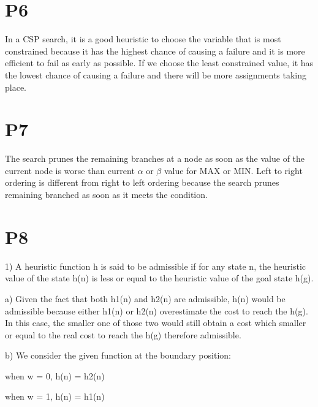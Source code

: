 \documentclass{article}
\begin{document}
\section*{P6}

\hspace{5mm}

In a CSP search, it is a good heuristic to choose the variable that is most constrained because it has the highest chance of causing a failure and it is more efficient to fail as early as possible. If we choose the least constrained value, it has the lowest chance of causing a failure and there will be more assignments taking place.

\section*{P7}

\hspace{5mm}



\hspace{5mm}

The search prunes the remaining branches at a node as soon as the value of the current node is worse than current $\alpha$ or $\beta$ value for MAX or MIN. Left to right ordering is different from right to left ordering because the search prunes remaining branched as soon as it meets the condition.

\section*{P8}

\hspace{5mm} 

1) A heuristic function h is said to be admissible if for any state n, the heuristic value of the state h{\small (n)} is less or equal to the heuristic value of the goal state h{\small (g)}.

a) Given the fact that both h{\small 1(n)} and h{\small 2(n)} are admissible, h{\small (n)} would be admissible because either h{\small 1(n)} or h{\small 2(n)} overestimate the cost to reach the h{\small (g)}. In this case, the smaller one of those two would still obtain a cost which smaller or equal to the real cost to reach the h{\small (g)} therefore admissible.

b) We consider the given function at the boundary position:
\begin{center}

when w = 0, h{\small(n)} = h{\small 2(n)}

when w = 1, h{\small(n)} = h{\small 1(n)}

\end{center}
\end{document}
